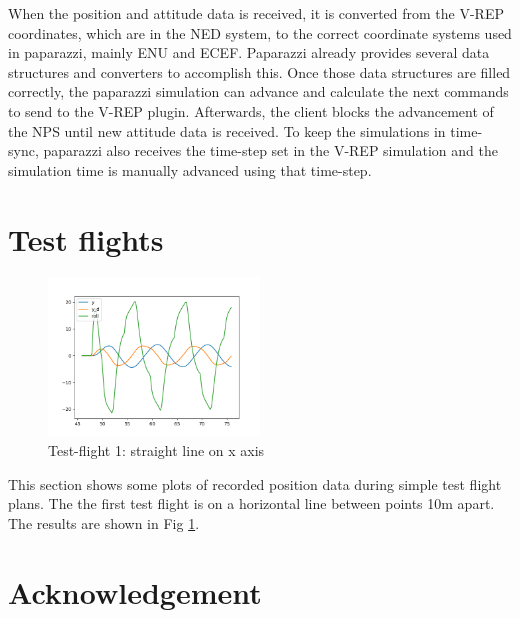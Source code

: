 \documentclass[journal]{IEEEtran}
\begin{document}
When the position and attitude data is received, it is converted from the V-REP coordinates, which are in the NED system, to
the correct coordinate systems used in paparazzi, mainly ENU and ECEF. Paparazzi already provides several data structures and converters to accomplish this. Once those data structures are filled correctly, the paparazzi simulation can advance and calculate the next commands to send to the V-REP plugin. Afterwards, the client blocks the advancement of the NPS until new attitude data is received. To keep the simulations in time-sync, paparazzi also receives the time-step set in the V-REP simulation and the simulation time is manually advanced using that time-step.



\section{Test flights}

\begin{figure}	
	\includegraphics[width=0.5\textwidth]{logplots/straight-y.png}
	\caption{Test-flight 1: straight line on x axis}
	\label{flight1}
\end{figure}
This section shows some plots of recorded position data during simple test flight plans.
The the first test flight is on a horizontal line between points 10m apart. The results are shown in Fig \ref{flight1}.





\section{Acknowledgement}




%

\end{document}
